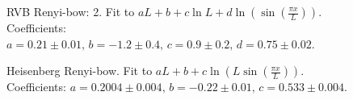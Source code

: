 \documentclass[prl,aps,twocolumn,floatfix,amsmath,amssymb,superscriptaddress,tightenlines]{revtex4}
\begin{document}
\begin{figure}[h]
  \begin{center}
  \end{center}
  \caption{RVB Renyi-bow: 2. Fit to $a L + b + c \ln L + d \ln \left( \sin \left
( \frac{\pi x}{L} \right) \right).$ Coefficients: $a = 0.21\pm 0.01, \, b = -1.2
 \pm 0.4, \, c = 0.9\pm 0.2, \, d = 0.75 \pm 0.02$.}
  \label{fig:2}
\end{figure}

\begin{figure}[h]
  \begin{center}
  \end{center}
  \caption{Heisenberg Renyi-bow. Fit to $a L + b + c \ln \left( L \sin \left( \frac{\pi x}{L} \right) \right).$ Coefficients: $a = 0.2004\pm 0.004, \, b = -0.22 \pm 0.01, \, c = 0.533\pm 0.004$.}
  \label{fig:3}
\end{figure}
\end{document}
